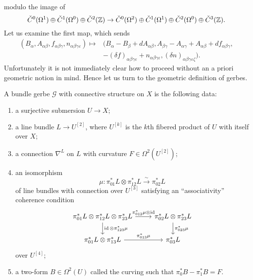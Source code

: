 \documentclass{amsart}
\begin{document}
modulo the image of
\begin{equation*}
    \check C^0(\Omega^1) \oplus \check C^1(\Omega^0) \oplus \check C^2(\mathbb{Z}) \to
    \check C^0(\Omega^2) \oplus \check C^1(\Omega^1) \oplus \check C^2(\Omega^0) \oplus \check C^3(\mathbb{Z}).
\end{equation*}
Let us examine the first map, which sends
\begin{align*}
    (B_\alpha, A_{\alpha\beta}, f_{\alpha\beta\gamma}, n_{\alpha\beta\gamma\varepsilon}) \mapsto &
    (B_\alpha-B_\beta+dA_{\alpha\beta}, A_{\beta\gamma}-A_{\alpha\gamma}+A_{\alpha\beta}+df_{\alpha\beta\gamma},\\
    &-(\delta f)_{\alpha\beta\gamma\varepsilon}+n_{\alpha\beta\gamma\varepsilon},(\delta n)_{\alpha\beta\gamma\varepsilon\zeta}).
\end{align*}
Unfortunately it is not immediately clear how to proceed without an a priori geometric
notion in mind. Hence let us turn to the geometric definition of gerbes. 

\begin{definition}
    A bundle gerbe $\mathcal{G}$ with connective structure on $X$ is the following data:
    \begin{enumerate}
        \item a surjective submersion $U\to X$;
        \item a line bundle $L\to U^{[2]}$, where $U^{[k]}$ is the $k$th fibered product
            of $U$ with itself over $X$;
        \item a connection $\nabla^L$ on $L$ with curvature $F\in\Omega^2(U^{[2]})$;
        \item an isomorphism
            \begin{equation*}
                \mu : \pi_{01}^*L \otimes \pi_{12}^*L \xrightarrow{\sim} \pi_{02}^*L
            \end{equation*}
            of line bundles with connection over $U^{[3]}$ satisfying an ``associativity''
            coherence condition
            \begin{equation*}
                \begin{tikzcd}
                    \pi_{01}^*L \otimes \pi_{12}^*L \otimes \pi_{23}^*L \rar{\pi_{012}^*\mu\otimes\id}\dar{\id \otimes \pi_{123}^*\mu}
                    & \pi_{02}^*L \otimes \pi_{23}^*L\dar{\pi_{023}^*\mu} \\
                    \pi_{01}^*L \otimes \pi_{13}^*L \rar{\pi_{013}^*\mu} & \pi_{03}^*L
                \end{tikzcd}
            \end{equation*}
            over $U^{[4]}$;
        \item a two-form $B\in\Omega^2(U)$ called the curving such that $\pi_0^*B - \pi_1^*B=F$.
    \end{enumerate}
\end{definition}
\end{document}
